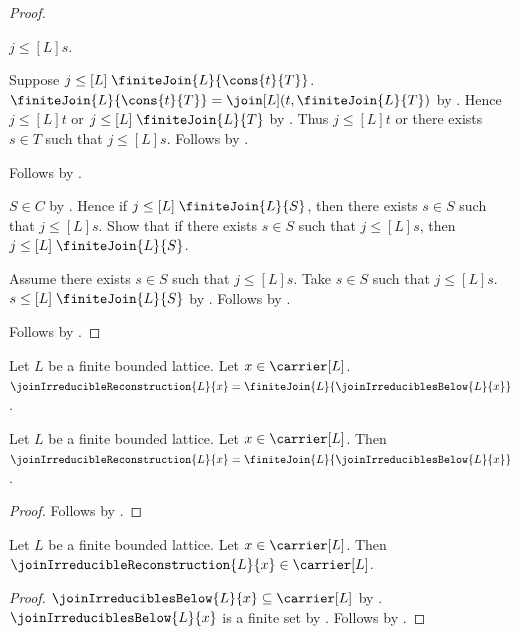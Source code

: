 \begin{proof}
\begin{subproof}
                $j\mathrel{\leq[L]}s$.
        \begin{subproof}
            Suppose $j\mathrel{\leq[L]}\finiteJoin{L}{\cons{t}{T}}$.
            $\finiteJoin{L}{\cons{t}{T}}
                =\join[L](t,\finiteJoin{L}{T})$ by
                .
            Hence $j\mathrel{\leq[L]}t$ or
                $j\mathrel{\leq[L]}\finiteJoin{L}{T}$ by
                .
            Thus $j\mathrel{\leq[L]}t$ or
                there exists $s\in T$ such that $j\mathrel{\leq[L]}s$.
            Follows by .
        \end{subproof}
        Follows by .
    \end{subproof}
    $S\in C$ by .
    Hence if $j\mathrel{\leq[L]}\finiteJoin{L}{S}$, then
        there exists $s\in S$ such that $j\mathrel{\leq[L]}s$.
    Show that if there exists $s\in S$ such that
        $j\mathrel{\leq[L]}s$, then
        $j\mathrel{\leq[L]}\finiteJoin{L}{S}$.
    \begin{subproof}
        Assume there exists $s\in S$ such that $j\mathrel{\leq[L]}s$.
        Take $s\in S$ such that $j\mathrel{\leq[L]}s$.
        $s\mathrel{\leq[L]}\finiteJoin{L}{S}$ by
            .
        Follows by .
    \end{subproof}
    Follows by \auto.
\end{proof}

\begin{definition}\label{join_irreducible_reconstruction}
    Let $L$ be a finite bounded lattice.
    Let $x\in\carrier[L]$.
    $\joinIrreducibleReconstruction{L}{x}
        =\finiteJoin{L}{\joinIrreduciblesBelow{L}{x}}$.
\end{definition}

\begin{proposition}\label{join_irreducible_reconstruction_apply}
    Let $L$ be a finite bounded lattice.
    Let $x\in\carrier[L]$.
    Then $\joinIrreducibleReconstruction{L}{x}
        =\finiteJoin{L}{\joinIrreduciblesBelow{L}{x}}$.
\end{proposition}
\begin{proof}
    Follows by .
\end{proof}

\begin{proposition}\label{join_irreducible_reconstruction_type}
    Let $L$ be a finite bounded lattice.
    Let $x\in\carrier[L]$.
    Then $\joinIrreducibleReconstruction{L}{x}\in\carrier[L]$.
\end{proposition}
\begin{proof}
    $\joinIrreduciblesBelow{L}{x}\subseteq\carrier[L]$ by
        .
    $\joinIrreduciblesBelow{L}{x}$ is a finite set by
        .
    Follows by
        .
\end{proof}


